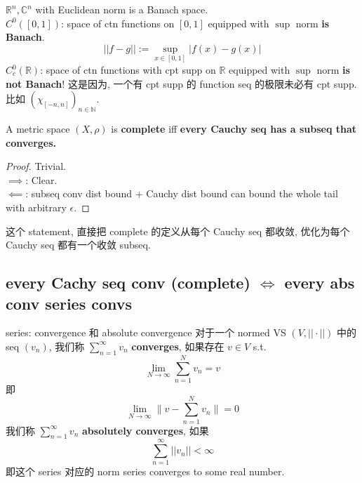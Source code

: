 \documentclass[lang=cn,11pt]{elegantbook}
\begin{document}
\begin{example}
    $\mathbb{R}^n, \mathbb{C}^n$ with Euclidean norm is a Banach space.\\
    $C^0([0,1])$: space of ctn functions on $[0,1]$ equipped with $\sup$ norm\textbf{ is Banach}. \[
    ||f- g|| := \sup_{x\in[0,1]} |f(x) - g(x)|
    \]
    $C^0_c(\mathbb{R})$: space of ctn functions with cpt supp on $\mathbb{R}$ equipped with $\sup$ norm\textbf{ is not Banach}! 这是因为, 一个有 cpt supp 的 function seq 的极限未必有 cpt supp. 比如 $(\chi_{[-n,n]})_{n\in \mathbb{N}}$.
\end{example}

\begin{lemma}
    A metric space $(X,\rho)$ is \textbf{complete} iff \textbf{every Cauchy seq has a subseq that converges.}
\end{lemma}
\begin{proof}
Trivial. \\
\(\implies\): Clear. \\
\(\impliedby\): subseq conv dist bound + Cauchy dist bound can bound the whole tail with arbitrary $\epsilon$.
\end{proof}这个 statement, 直接把 complete 的定义从每个 Cauchy seq 都收敛, 优化为每个 Cauchy seq 都有一个收敛 subseq. 

\subsection{every Cachy seq conv (complete) $\iff$ every abs conv series convs}
\begin{definition}{series: convergence 和 absolute convergence}
对于一个 normed VS $(V,||\cdot||)$ 中的 seq $(v_n)$, 我们称 \(\sum_{n=1}^\infty v_n\) \textbf{converges}, 如果存在 $v\in V$ s.t. \[
\lim_{N\to\infty} \sum_{n=1}^N v_n  = v
\]
即 \[
\lim_{N\to\infty} \|  v - \sum_{n=1}^N v_n\| = 0
\]
我们称 \(\sum_{n=1}^\infty v_n\) \textbf{absolutely converges}, 如果 \[ \sum_{n=1}^\infty ||v_n|| < \infty\]
即这个 series 对应的 norm series converges to some real number.
\end{definition}
\end{document}
